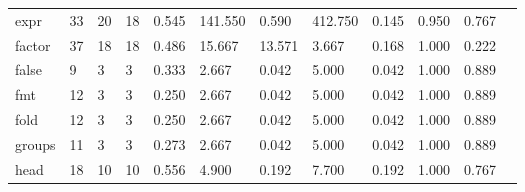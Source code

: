 \begin{longtable}{lp{1.00cm}p{1.00cm}p{1.00cm}p{1.00cm}p{1.00cm}p{1.00cm}p{1.00cm}p{1.00cm}p{1.00cm}p{1.00cm}p{1.00cm}}
expr      &                           33 &                 20 &                                18 &                                      0.545 &                                141.550 &                                        0.590 &                           412.750 &                                   0.145 &                        0.950 &                                        0.767 \\
factor    &                           37 &                 18 &                                18 &                                      0.486 &                                 15.667 &                                       13.571 &                             3.667 &                                   0.168 &                        1.000 &                                        0.222 \\
false     &                            9 &                  3 &                                 3 &                                      0.333 &                                  2.667 &                                        0.042 &                             5.000 &                                   0.042 &                        1.000 &                                        0.889 \\
fmt       &                           12 &                  3 &                                 3 &                                      0.250 &                                  2.667 &                                        0.042 &                             5.000 &                                   0.042 &                        1.000 &                                        0.889 \\
fold      &                           12 &                  3 &                                 3 &                                      0.250 &                                  2.667 &                                        0.042 &                             5.000 &                                   0.042 &                        1.000 &                                        0.889 \\
groups    &                           11 &                  3 &                                 3 &                                      0.273 &                                  2.667 &                                        0.042 &                             5.000 &                                   0.042 &                        1.000 &                                        0.889 \\
head      &                           18 &                 10 &                                10 &                                      0.556 &                                  4.900 &                                        0.192 &                             7.700 &                                   0.192 &                        1.000 &                                        0.767 \\

\end{longtable}
